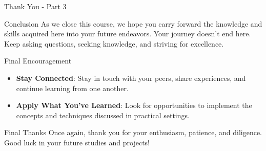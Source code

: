 \documentclass[aspectratio=169]{beamer}
\begin{document}
\begin{frame}[fragile]{Thank You - Part 3}
  \begin{block}{Conclusion}
    As we close this course, we hope you carry forward the knowledge and skills acquired here into your future endeavors. Your journey doesn't end here. Keep asking questions, seeking knowledge, and striving for excellence.
  \end{block}

  \begin{block}{Final Encouragement}
    \begin{itemize}
      \item \textbf{Stay Connected}: Stay in touch with your peers, share experiences, and continue learning from one another.
      \item \textbf{Apply What You’ve Learned}: Look for opportunities to implement the concepts and techniques discussed in practical settings. 
    \end{itemize}
  \end{block}

  \begin{block}{Final Thanks}
    Once again, thank you for your enthusiasm, patience, and diligence. Good luck in your future studies and projects!
  \end{block}
\end{frame}
\end{document}

